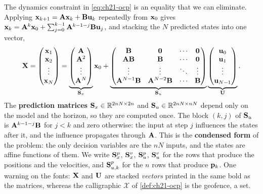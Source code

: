 The dynamics constraint in \cref{eq:ch21-ocp} is an equality that we can
eliminate. Applying $\mathbf{x}_{k+1}=\mathbf{A}\mathbf{x}_k+\mathbf{B}\mathbf{u}_k$ repeatedly
from $\mathbf{x}_0$ gives $\mathbf{x}_k=\mathbf{A}^{k}\mathbf{x}_0+\sum_{j=0}^{k-1}\mathbf{A}^{k-1-j}\mathbf{B}\mathbf{u}_j$,
and stacking the $N$ predicted states into one vector,
\begin{equation}
\mathbf{X}=\begin{pmatrix}\mathbf{x}_1\\\mathbf{x}_2\\\vdots\\\mathbf{x}_N\end{pmatrix}
=\underbrace{\begin{pmatrix}\mathbf{A}\\\mathbf{A}^2\\\vdots\\\mathbf{A}^N\end{pmatrix}}_{\mathbf{S}_x}\mathbf{x}_0
+\underbrace{\begin{pmatrix}\mathbf{B}&\mathbf{0}&\cdots&\mathbf{0}\\\mathbf{A}\mathbf{B}&\mathbf{B}&\cdots&\mathbf{0}\\\vdots&\vdots&\ddots&\vdots\\\mathbf{A}^{N-1}\mathbf{B}&\mathbf{A}^{N-2}\mathbf{B}&\cdots&\mathbf{B}\end{pmatrix}}_{\mathbf{S}_u}
\underbrace{\begin{pmatrix}\mathbf{u}_0\\\mathbf{u}_1\\\vdots\\\mathbf{u}_{N-1}\end{pmatrix}}_{\mathbf{U}} .
\label{eq:ch21-prediction}
\end{equation}
The \textbf{prediction matrices}
$\mathbf{S}_x\in\mathbb{R}^{2nN\times2n}$ and $\mathbf{S}_u\in\mathbb{R}^{2nN\times nN}$ depend only
on the model and the horizon, so they are computed once. The block
$(k,j)$ of $\mathbf{S}_u$ is $\mathbf{A}^{k-1-j}\mathbf{B}$ for $j<k$ and zero
otherwise: the input at step $j$ influences the states after it, and the
influence propagates through $\mathbf{A}$. This is the \textbf{condensed
form} of
the problem: the only decision variables are the $nN$ inputs, and the states
are affine functions of them. We write $\mathbf{S}_x^{p}$, $\mathbf{S}_x^{v}$,
$\mathbf{S}_u^{p}$, $\mathbf{S}_u^{v}$ for the rows that produce the positions and
the velocities, and $\mathbf{S}_{u,k}^{p}$ for the $n$ rows that produce
$\mathbf{p}_k$. One warning on the fonts: $\mathbf{X}$ and $\mathbf{U}$ are stacked
\emph{vectors} printed in the same bold as the matrices, whereas the calligraphic
$\mathcal{X}$ of \cref{def:ch21-ocp} is the geofence, a set.

